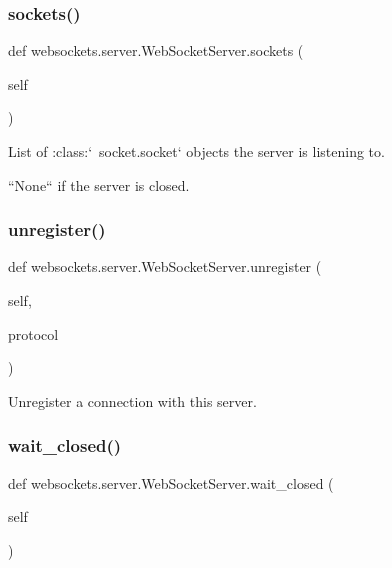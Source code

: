 \subsubsection{\texorpdfstring{sockets()}{sockets()}}
{\footnotesize\ttfamily def websockets.\+server.\+Web\+Socket\+Server.\+sockets (\begin{DoxyParamCaption}\item[{}]{self }\end{DoxyParamCaption})}

\begin{DoxyVerb}List of :class:`~socket.socket` objects the server is listening to.

``None`` if the server is closed.\end{DoxyVerb}
 \mbox{\label{classwebsockets_1_1server_1_1_web_socket_server_aa31d87887a41677810ee3bf697c91c6b}} 
\subsubsection{\texorpdfstring{unregister()}{unregister()}}
{\footnotesize\ttfamily def websockets.\+server.\+Web\+Socket\+Server.\+unregister (\begin{DoxyParamCaption}\item[{}]{self,  }\item[{}]{protocol }\end{DoxyParamCaption})}

\begin{DoxyVerb}Unregister a connection with this server.\end{DoxyVerb}
 \mbox{\label{classwebsockets_1_1server_1_1_web_socket_server_a26e9d65297da6b0cbd03bdffb59da006}} 
\subsubsection{\texorpdfstring{wait\+\_\+closed()}{wait\_closed()}}
{\footnotesize\ttfamily def websockets.\+server.\+Web\+Socket\+Server.\+wait\+\_\+closed (\begin{DoxyParamCaption}\item[{}]{self }\end{DoxyParamCaption})}

